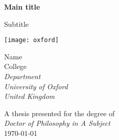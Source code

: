 \begin{titlepage}
    \begin{center}
 
        \vspace*{0.5cm}
        \LARGE
        \textbf{Main title}
        
        \Large
        Subtitle
 
        \vspace{2cm}
 
        \texttt{[image: oxford]}
 
        \vspace{1.5cm}
        
         \large
        Name\\
        \vspace{0.6cm}
        \normalsize
        College \\
        \vspace{0.6cm}
        \textsl{Department\\
        University of Oxford\\
        United Kingdom}\\
        
        
        \vspace{1cm}
        
        A thesis presented for the degree of\\
        \textsl{Doctor of Philosophy in A Subject}\\
        
        \today
 
    \end{center}
\end{titlepage}